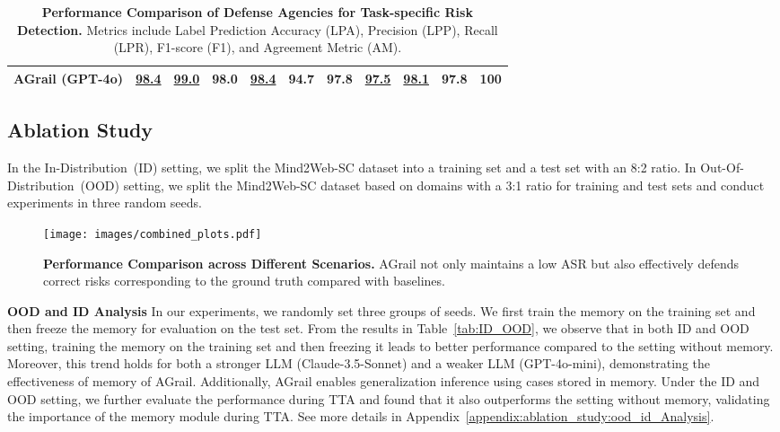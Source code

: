 \begin{table*}[ht]
{\begin{threeparttable}
\begin{tabular}{@{}lcccccccccc@{}}
        \textbf{AGrail  (GPT-4o)} & \underline{98.4} & \underline{99.0} & 98.0 & \underline{98.4} & 94.7 
                               & 97.8 & \underline{97.5} & \underline{98.1} & 97.8 & 100 \\
        \bottomrule
    \end{tabular}
    \end{threeparttable}
    }
    \caption{\small \textbf{Performance Comparison of Defense Agencies for Task-specific Risk Detection.} Metrics include Label Prediction Accuracy (LPA), Precision (LPP), Recall (LPR), F1-score (F1), and Agreement Metric (AM). }
    \label{table:defense_agencies_comparison_on_Mind2Web_EICU}
    \vspace{-0.8em}
\end{table*}
\subsection{Ablation Study}
In the In-Distribution~(ID) setting, we split the Mind2Web-SC dataset into a training set and a test set with an 8:2 ratio. In Out-Of-Distribution~(OOD) setting, we split the Mind2Web-SC dataset based on domains with a 3:1 ratio for training and test sets and conduct experiments in three random seeds.\par 
\begin{figure*}[ht]
    \centering
    \texttt{[image: images/combined\_plots.pdf]}
    \vspace{-1em}
    \caption{\small \textbf{Performance Comparison across Different Scenarios.} AGrail  not only maintains a low ASR but also effectively defends correct risks corresponding to the ground truth compared with baselines.}
    \label{fig:combined_performance}
    \vspace{-0.8em}
\end{figure*}
\smallskip\noindent\textbf{OOD and ID Analysis} In our experiments, we randomly set three groups of seeds. We first train the memory on the training set and then freeze the memory for evaluation on the test set. From the results in Table~\ref{tab:ID_OOD}, we observe that in both ID and OOD setting, training the memory on the training set and then freezing it leads to better performance compared to the setting without memory. Moreover, this trend holds for both a stronger LLM (Claude-3.5-Sonnet) and a weaker LLM (GPT-4o-mini), demonstrating the effectiveness of memory of AGrail. Additionally,  AGrail enables generalization inference using cases stored in memory. Under the ID and OOD setting, we further evaluate the performance during TTA and found that it also outperforms the setting without memory, validating the importance of the memory module during TTA. See more details in Appendix~\ref{appendix:ablation_study:ood_id_Analysis}.\par
